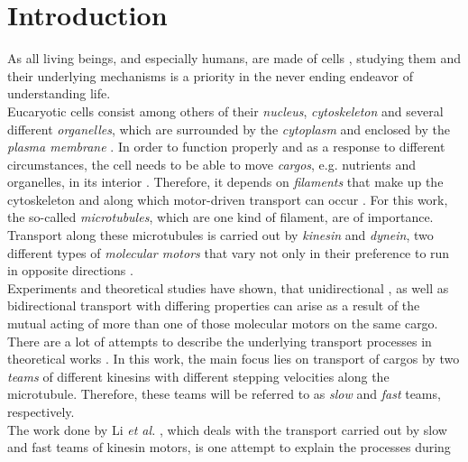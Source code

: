 \newpage
\pagestyle{useheadings} %

\tableofcontents %
\listoffigures %
\listoftables %


\chapter{Introduction}
As all living beings, and especially humans, are made of cells \cite{alberts}, studying them and their underlying mechanisms is a priority in the never ending endeavor of understanding life. \\
Eucaryotic cells consist among others of their \textit{nucleus}, \textit{cytoskeleton} and several different \textit{organelles}, which are surrounded by the \textit{cytoplasm} and enclosed by the 
\textit{plasma membrane} \cite{alberts}. In order to function properly and as a response to different circumstances, the cell needs to be able to move \textit{cargos}, e.g. nutrients and
organelles, in its interior \cite{alberts}. Therefore, it depends on \textit{filaments} that make up the cytoskeleton and along which motor-driven transport can occur \cite{alberts}.
For this work, the so-called \textit{microtubules}, which are one kind of filament, are of importance. Transport along these microtubules is carried out by \textit{kinesin}
and \textit{dynein}, two different types of \textit{molecular motors} that vary not only in their preference to run in opposite directions \cite{alberts}. \\
Experiments and theoretical studies have shown, that unidirectional \cite{larson, bieling, jcb174}, as well as bidirectional \cite{cb14, pnas105} transport with differing properties can arise as a result of the
mutual acting of more than one of those molecular motors on the same cargo. There are a lot of attempts to describe the underlying transport processes in theoretical works \cite{pnas105, li, sklein}. In
this work, the main focus lies on transport of cargos by two \textit{teams} of different kinesins with different stepping velocities along the microtubule. Therefore, these teams
will be referred to as \textit{slow} and \textit{fast} teams, respectively. \\
The work done by Li \textit{et al.} \cite{li}, which deals with the transport carried out by slow and fast teams of kinesin motors, is one attempt to explain the processes during
